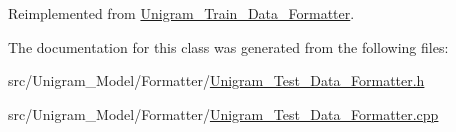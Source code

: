 Reimplemented from \hyperlink{class_unigram___train___data___formatter_a0023886209f7fd1441a256238c86844a}{Unigram\_\-Train\_\-Data\_\-Formatter}.



The documentation for this class was generated from the following files:\begin{DoxyCompactItemize}
\item 
src/Unigram\_\-Model/Formatter/\hyperlink{_unigram___test___data___formatter_8h}{Unigram\_\-Test\_\-Data\_\-Formatter.h}\item 
src/Unigram\_\-Model/Formatter/\hyperlink{_unigram___test___data___formatter_8cpp}{Unigram\_\-Test\_\-Data\_\-Formatter.cpp}\end{DoxyCompactItemize}
